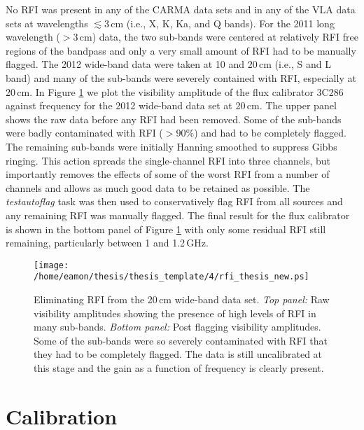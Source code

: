 No RFI was present in any of the CARMA data sets and in any of the VLA data sets at wavelengths $\lesssim 3$\,cm (i.e., X, K, Ka, and Q bands). For the 2011 long wavelength ($> 3$\,cm) data, the two sub-bands were centered at relatively RFI free regions of the bandpass and only a very small amount of RFI had to be manually flagged. The 2012 wide-band data were taken at 10 and 20\,cm (i.e., S and L band) and many of the sub-bands were severely contained with RFI, especially at 20\,cm. In Figure \ref{fig:4.3} we plot the visibility amplitude of the flux calibrator 3C286 against frequency for the 2012 wide-band data set at 20\,cm. The upper panel shows the raw data before any RFI had been removed. Some of the sub-bands were badly contaminated with RFI ($>90\%$) and had to be completely flagged. The remaining sub-bands were initially Hanning smoothed to suppress Gibbs ringing. This action spreads the single-channel RFI into three channels, but importantly removes the effects of some of the worst RFI from a number of channels and allows as much good data to be retained as possible. The \textit{testautoflag} task was then used to conservatively flag RFI from all sources and any remaining RFI was manually flagged. The final result for the flux calibrator is shown in the bottom panel of Figure \ref{fig:4.3} with only some residual RFI still remaining, particularly between 1 and 1.2\,GHz.

\begin{figure}[hbt!]
\centering 
\texttt{[image: /home/eamon/thesis/thesis\_template/4/rfi\_thesis\_new.ps]}  
\caption[Eliminating RFI from the L band data set.]{Eliminating RFI from the 20\,cm wide-band data set. \textit{Top panel:} Raw visibility amplitudes showing the presence of high levels of RFI in many sub-bands. \textit{Bottom panel:} Post flagging visibility amplitudes. Some of the sub-bands were so severely contaminated with RFI that they had to be completely flagged. The data is still uncalibrated at this stage and the gain as a function of frequency is clearly present.}
\label{fig:4.3}
\end{figure}

\section{Calibration}\label{sec:4.2}

